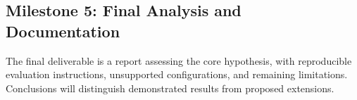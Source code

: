 \subsection{Milestone 5: Final Analysis and Documentation}
\label{sec:milestone-5}

The final deliverable is a report assessing the core hypothesis, with reproducible evaluation instructions, unsupported configurations, and remaining limitations. Conclusions will distinguish demonstrated results from proposed extensions.
